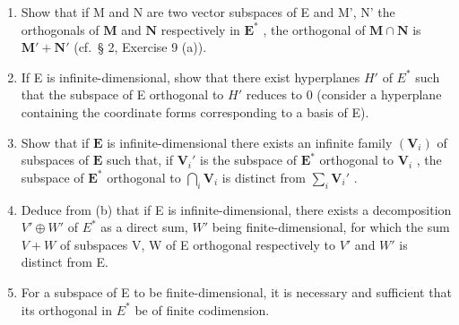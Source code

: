 \begin{enumerate}
\def\labelenumi{(\alph{enumi})}
\item
  Show that if M and N are two vector subspaces of E and M', N' the orthogonals of \(\mathbf{M}\) and \(\mathbf{N}\) respectively in \(\mathbf{E}^*\) , the orthogonal of \(\mathbf{M} \cap \mathbf{N}\) is \(\mathbf{M}' + \mathbf{N}'\) (cf.~§ 2, Exercise 9 (a)).
\item
  If E is infinite-dimensional, show that there exist hyperplanes \(H'\) of \(E^{*}\) such that the subspace of E orthogonal to \(H'\) reduces to 0 (consider a hyperplane containing the coordinate forms corresponding to a basis of E).
\item
  Show that if \(\mathbf{E}\) is infinite-dimensional there exists an infinite family \((\mathbf{V}_i)\) of subspaces of \(\mathbf{E}\) such that, if \(\mathbf{V}_i'\) is the subspace of \(\mathbf{E}^*\) orthogonal to \(\mathbf{V}_i\) , the subspace of \(\mathbf{E}^*\) orthogonal to \(\bigcap_{i} \mathbf{V}_i\) is distinct from \(\sum_{i} \mathbf{V}_i'\) .
\item
  Deduce from (b) that if E is infinite-dimensional, there exists a decomposition \(V' \oplus W'\) of \(E^{*}\) as a direct sum, \(W'\) being finite-dimensional, for which the sum \(V + W\) of subspaces V, W of E orthogonal respectively to \(V'\) and \(W'\) is distinct from E.
\item
  For a subspace of E to be finite-dimensional, it is necessary and sufficient that its orthogonal in \(E^{*}\) be of finite codimension.
\end{enumerate}

